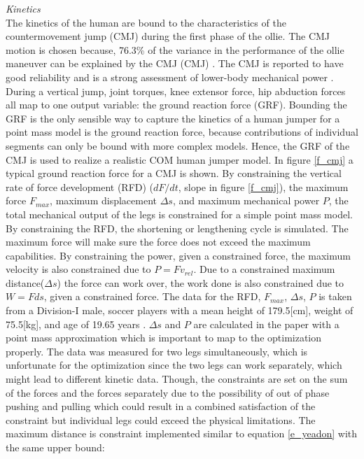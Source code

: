 \documentclass[default,iicol]{sn-jnl}
\begin{document}
\textit{Kinetics} \\
The kinetics of the human are bound to the characteristics of the countermovement jump (CMJ) during the first phase of the ollie. The CMJ motion is chosen because, 76.3\% of the variance in the performance of the ollie maneuver can be explained by the CMJ (CMJ) \cite{candotti_lower_2012}. The CMJ is reported to have good reliability and is a strong assessment of lower-body mechanical power \cite{barker_relationships_2018}. During a vertical jump, joint torques, knee extensor force, hip abduction forces all map to one output variable: the ground reaction force (GRF). Bounding the GRF is the only sensible way to capture the kinetics of a human jumper for a point mass model is the ground reaction force, because contributions of individual segments can only be bound with more complex models. Hence, the GRF of the CMJ is used to realize a realistic COM human jumper model. In figure \ref{f_cmj} a typical ground reaction force for a CMJ is shown. By constraining the vertical rate of force development (RFD) ($dF/dt$, slope in figure \ref{f_cmj}), the maximum force $F_{max}$, maximum displacement $\Delta s$, and maximum mechanical power $P$, the total mechanical output of the legs is constrained for a simple point mass model. By constraining the RFD, the shortening or lengthening cycle is simulated. The maximum force will make sure the force does not exceed the maximum capabilities. By constraining the power, given a constrained force, the maximum velocity is also constrained due to $P = F v_{rel}$.
Due to a constrained maximum distance($ \Delta s $) the force can work over, the work done is also constrained due to $ W = F ds $, given a constrained force. The data for the RFD, $ F_{max} $, $ \Delta s $, $ P $ is taken from a Division-I male, soccer players with a mean height of 179.5[cm], weight of 75.5[kg], and age of 19.65 years \cite{barker_relationships_2018}. $ \Delta s $ and $ P $ are calculated in the paper with a point mass approximation which is important to map to the optimization properly. The data was measured for two legs simultaneously, which is unfortunate for the optimization since the two legs can work separately, which might lead to different kinetic data. Though, the constraints are set on the sum of the forces and the forces separately due to the possibility of out of phase pushing and pulling which could result in a combined satisfaction of the constraint but individual legs could exceed the physical limitations. The maximum distance is constraint implemented similar to equation \ref{e_yeadon} with the same upper bound:
\end{document}
